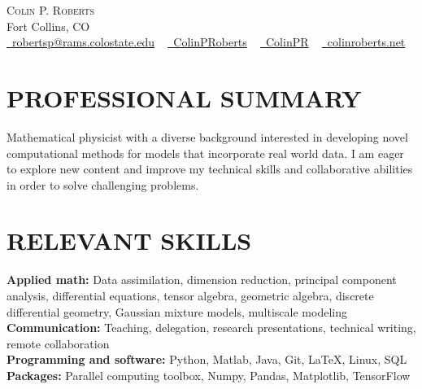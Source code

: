 \documentclass[letterpaper,11pt]{article}
\newcommand{\accentcolor}[1]{\textcolor{accentcolor}{#1}}
\begin{document}


\begin{center}
    {\Huge \scshape Colin P. Roberts} \\ \vspace{1pt}
    Fort Collins, CO \\ \vspace{1pt}
    \href{mailto:robertsp@rams.colostate.edu}{\faEnvelope \ \accentcolor{robertsp@rams.colostate.edu}} ~
    \href{https://www.linkedin.com/in/colinproberts/}{\faLinkedin \ \accentcolor{ColinPRoberts}}  ~
    \href{https://github.com/ColinPR}{\faGithub \ \accentcolor{ColinPR}} ~
    \href{https://www.colinroberts.net}{\faGreaterThan \ \accentcolor{colinroberts.net}}
\end{center}

\vspace*{-10pt}
\section{PROFESSIONAL SUMMARY}

    Mathematical physicist with a diverse background interested in developing novel computational methods for models that incorporate real world data. I am eager to explore new content and improve my technical skills and collaborative abilities in order to solve challenging problems. 
 \vspace{-5pt}
\section{RELEVANT SKILLS}
 \begin{itemize}[leftmargin=0in, label={}]
    \small{\item{

     \textbf{\normalsize{Applied math:}}{ \normalsize{Data assimilation, dimension reduction, principal component analysis, differential equations, tensor algebra, geometric algebra, discrete differential geometry, Gaussian mixture models, multiscale modeling}} \\
     \textbf{\normalsize{Communication:}}{ \normalsize{Teaching, delegation, research presentations, technical writing, remote collaboration}} \\
     \textbf{\normalsize{Programming and software:}}{ \normalsize{Python, Matlab, Java, Git, \LaTeX, Linux, SQL}} \\
     \textbf{\normalsize{Packages:}}{ \normalsize{Parallel computing toolbox, Numpy, Pandas, Matplotlib, TensorFlow}} \\	
	}}
 \end{itemize}
 \vspace{-25pt}
\end{document}

